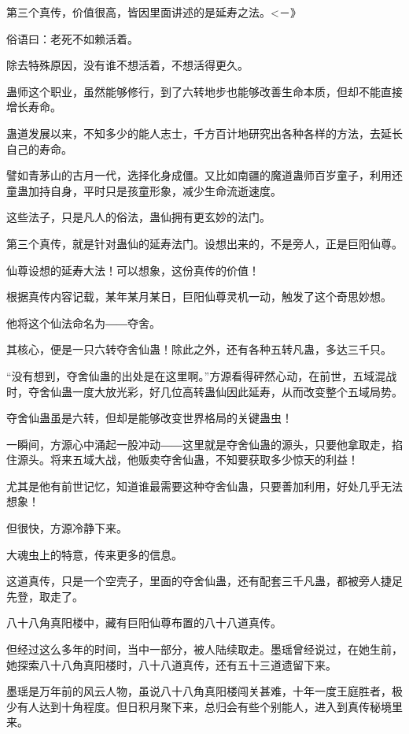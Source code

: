 
\begin{this_body}

第三个真传，价值很高，皆因里面讲述的是延寿之法。<－》

俗语曰：老死不如赖活着。

除去特殊原因，没有谁不想活着，不想活得更久。

蛊师这个职业，虽然能够修行，到了六转地步也能够改善生命本质，但却不能直接增长寿命。

蛊道发展以来，不知多少的能人志士，千方百计地研究出各种各样的方法，去延长自己的寿命。

譬如青茅山的古月一代，选择化身成僵。又比如南疆的魔道蛊师百岁童子，利用还童蛊加持自身，平时只是孩童形象，减少生命流逝速度。

这些法子，只是凡人的俗法，蛊仙拥有更玄妙的法门。

第三个真传，就是针对蛊仙的延寿法门。设想出来的，不是旁人，正是巨阳仙尊。

仙尊设想的延寿大法！可以想象，这份真传的价值！

根据真传内容记载，某年某月某日，巨阳仙尊灵机一动，触发了这个奇思妙想。

他将这个仙法命名为――夺舍。

其核心，便是一只六转夺舍仙蛊！除此之外，还有各种五转凡蛊，多达三千只。

“没有想到，夺舍仙蛊的出处是在这里啊。”方源看得砰然心动，在前世，五域混战时，夺舍仙蛊一度大放光彩，好几位高转蛊仙因此延寿，从而改变整个五域局势。

夺舍仙蛊虽是六转，但却是能够改变世界格局的关键蛊虫！

一瞬间，方源心中涌起一股冲动――这里就是夺舍仙蛊的源头，只要他拿取走，掐住源头。将来五域大战，他贩卖夺舍仙蛊，不知要获取多少惊天的利益！

尤其是他有前世记忆，知道谁最需要这种夺舍仙蛊，只要善加利用，好处几乎无法想象！

但很快，方源冷静下来。

大魂虫上的特意，传来更多的信息。

这道真传，只是一个空壳子，里面的夺舍仙蛊，还有配套三千凡蛊，都被旁人捷足先登，取走了。

八十八角真阳楼中，藏有巨阳仙尊布置的八十八道真传。

但经过这么多年的时间，当中一部分，被人陆续取走。墨瑶曾经说过，在她生前，她探索八十八角真阳楼时，八十八道真传，还有五十三道遗留下来。

墨瑶是万年前的风云人物，虽说八十八角真阳楼闯关甚难，十年一度王庭胜者，极少有人达到十角程度。但日积月聚下来，总归会有些个别能人，进入到真传秘境里来。


\end{this_body}
